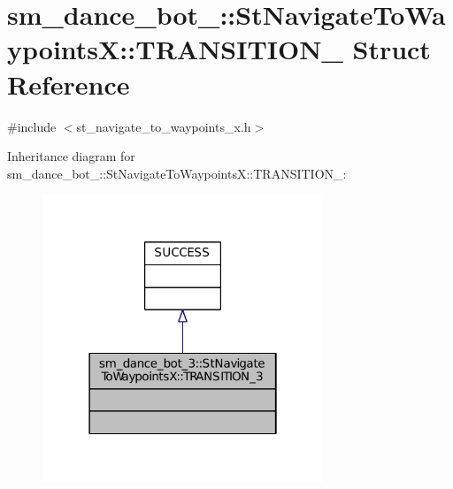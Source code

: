 \hypertarget{structsm__dance__bot__3_1_1StNavigateToWaypointsX_1_1TRANSITION__3}{}\section{sm\+\_\+dance\+\_\+bot\+\_\+:\+:St\+Navigate\+To\+WaypointsX\+:\+:T\+R\+A\+N\+S\+I\+T\+I\+O\+N\+\_ Struct Reference}
\label{structsm__dance__bot__3_1_1StNavigateToWaypointsX_1_1TRANSITION__3}


{\ttfamily \#include $<$st\+\_\+navigate\+\_\+to\+\_\+waypoints\+\_\+x.\+h$>$}



Inheritance diagram for sm\+\_\+dance\+\_\+bot\+\_\+:\+:St\+Navigate\+To\+WaypointsX\+:\+:T\+R\+A\+N\+S\+I\+T\+I\+O\+N\+\_\+:
\nopagebreak
\begin{figure}[H]
\begin{center}
\leavevmode
\includegraphics[width=238pt]{structsm__dance__bot__3_1_1StNavigateToWaypointsX_1_1TRANSITION__3__inherit__graph}
\end{center}
\end{figure}


